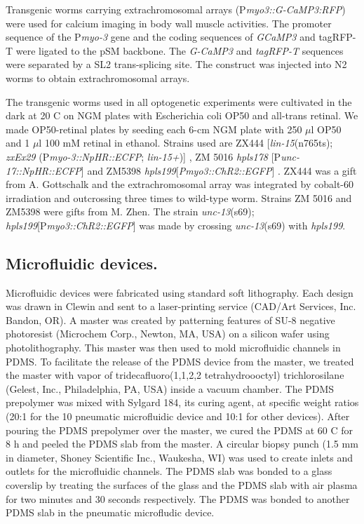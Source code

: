 Transgenic worms carrying extrachromosomal arrays (P\textit{myo3::G-CaMP3:RFP}) were used for 
calcium imaging in body wall muscle activities. The promoter sequence of the P\textit{myo-3} gene \citep{kuroyanagi_transgenic_2006} and the coding sequences of \textit{GCaMP3} and tagRFP-T were ligated to the pSM backbone. The \textit{G-CaMP3} and \textit{tagRFP-T} sequences were separated by a SL2 trans-splicing site. The construct was 
injected into N2 worms to obtain extrachromosomal arrays.  

The transgenic worms used in all optogenetic experiments were cultivated in the dark at 20 \textdegree C on 
NGM plates with Escherichia coli OP50 and all-trans retinal. We made OP50-retinal plates by 
seeding each 6-cm NGM plate with 250 $\mu$l OP50 and 1 $\mu$l 100 mM retinal in ethanol. Strains used are ZX444 [\textit{lin-15}(n765ts); \textit{zxEx29} (P\textit{myo-3::NpHR::ECFP}; \textit{lin-15+})] , ZM 5016 \textit{hpls178} [P\textit{unc-17::NpHR::ECFP}] and ZM5398 \textit{hpls199}[\textit{Pmyo3::ChR2::EGFP}] . ZX444 was a gift from A. Gottschalk and the extrachromosomal array was integrated by cobalt-60 irradiation and outcrossing three times to wild-type worm. Strains ZM 5016 and ZM5398 were gifts from M. Zhen. The strain \textit{unc-13}(s69); \textit{hpls199}[P\textit{myo3::ChR2::EGFP}] was made by crossing \textit{unc-13}(s69) with \textit{hpls199}. 

\subsection{Microfluidic devices.} 
Microfluidic devices were fabricated using standard soft lithography. Each 
design was drawn in Clewin and sent to a laser-printing service (CAD/Art Services, Inc. Bandon, 
OR).  A master was created by patterning features of SU-8 negative photoresist (Microchem 
Corp., Newton, MA, USA) on a silicon wafer using photolithography. This master was then used 
to mold microfluidic channels in PDMS. To facilitate the release of the PDMS device from the 
master, we treated the master with vapor of tridecafluoro(1,1,2,2 tetrahydroooctyl) 
trichlorosilane (Gelest, Inc., Philadelphia, PA, USA) inside a vacuum chamber. The PDMS 
prepolymer was mixed with Sylgard 184, its curing agent, at specific weight ratios (20:1 for the 
 10
pneumatic microfluidic device and 10:1 for other devices). After pouring the PDMS prepolymer 
over the master, we cured the PDMS at 60 \textdegree C for 8 h and peeled the PDMS slab from the master. 
A circular biopsy punch (1.5 mm in diameter, Shoney Scientific Inc., Waukesha, WI) was used to 
create inlets and outlets for the microfluidic channels. The PDMS slab was bonded to a glass 
coverslip by treating the surfaces of the glass and the PDMS slab with air plasma for two 
minutes and 30 seconds respectively. The PDMS was bonded to another PDMS slab in the 
pneumatic microfludic device.


